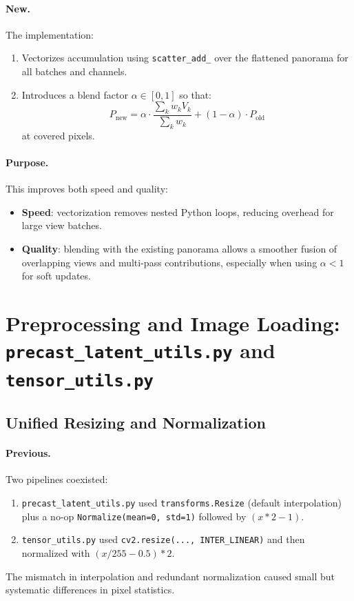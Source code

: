 \documentclass[11pt,a4paper]{article}
\newcommand{\file}[1]{\texttt{#1}}
\newcommand{\fn}[1]{\texttt{#1}}
\begin{document}
\paragraph{New.}
The implementation:
\begin{enumerate}
    \item Vectorizes accumulation using \fn{scatter\_add\_} over the flattened panorama for all batches and channels.
    \item Introduces a blend factor \(\alpha\in[0,1]\) so that:
    \[
        P_\text{new} =
        \alpha \cdot \frac{\sum_k w_k V_k}{\sum_k w_k}
        + (1-\alpha) \cdot P_\text{old}
    \]
    at covered pixels.
\end{enumerate}

\paragraph{Purpose.}
This improves both speed and quality:
\begin{itemize}
    \item \textbf{Speed}: vectorization removes nested Python loops, reducing overhead for large view batches.
    \item \textbf{Quality}: blending with the existing panorama allows a smoother fusion of overlapping views and multi-pass contributions, especially when using \(\alpha<1\) for soft updates.
\end{itemize}

\section{Preprocessing and Image Loading: \file{precast\_latent\_utils.py} and \file{tensor\_utils.py}}

\subsection{Unified Resizing and Normalization}

\paragraph{Previous.}
Two pipelines coexisted:
\begin{enumerate}
    \item \file{precast\_latent\_utils.py} used \fn{transforms.Resize} (default interpolation) plus a no-op \fn{Normalize(mean=0, std=1)} followed by \((x*2-1)\).
    \item \file{tensor\_utils.py} used \fn{cv2.resize(..., INTER\_LINEAR)} and then normalized with \((x/255-0.5)*2\).
\end{enumerate}
The mismatch in interpolation and redundant normalization caused small but systematic differences in pixel statistics.
\end{document}
